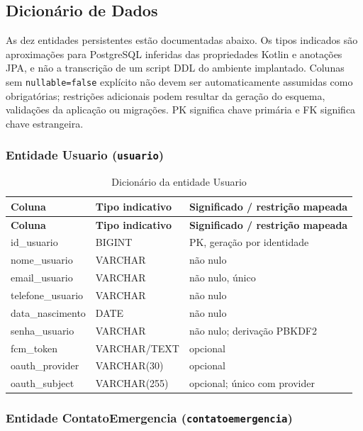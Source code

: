\subsection{Dicionário de Dados}

As dez entidades persistentes estão documentadas abaixo. Os tipos indicados são aproximações para PostgreSQL inferidas das propriedades Kotlin e anotações JPA, e não a transcrição de um script DDL do ambiente implantado. Colunas sem \texttt{nullable=false} explícito não devem ser automaticamente assumidas como obrigatórias; restrições adicionais podem resultar da geração do esquema, validações da aplicação ou migrações. PK significa chave primária e FK significa chave estrangeira.

\subsubsection{Entidade Usuario (\texttt{usuario})}

\begin{longtable}{p{4.8cm}p{3.05cm}p{5.05cm}}
\caption{Dicionário da entidade Usuario}\label{quad_usuario}\\
\hline
\textbf{Coluna} & \textbf{Tipo indicativo} & \textbf{Significado / restrição mapeada} \\
\hline
\endfirsthead
\hline\textbf{Coluna} & \textbf{Tipo indicativo} & \textbf{Significado / restrição mapeada} \\
\hline
\endhead
id\_usuario & BIGINT & PK, geração por identidade \\
\hline
nome\_usuario & VARCHAR & não nulo \\
\hline
email\_usuario & VARCHAR & não nulo, único \\
\hline
telefone\_usuario & VARCHAR & não nulo \\
\hline
data\_nascimento & DATE & não nulo \\
\hline
senha\_usuario & VARCHAR & não nulo; derivação PBKDF2 \\
\hline
fcm\_token & VARCHAR/TEXT & opcional \\
\hline
oauth\_provider & VARCHAR(30) & opcional \\
\hline
oauth\_subject & VARCHAR(255) & opcional; único com provider \\
\hline
\end{longtable}

\subsubsection{Entidade ContatoEmergencia (\texttt{contatoemergencia})}

